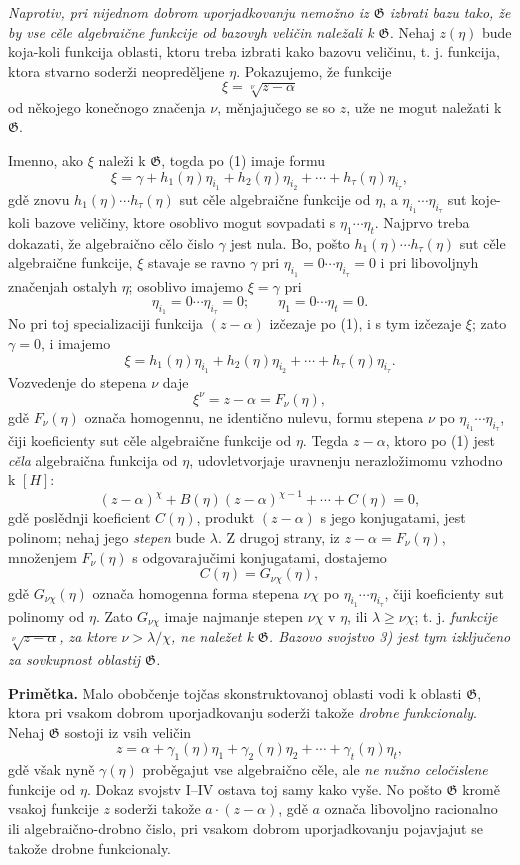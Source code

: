 \documentclass[11pt]{article}
\begin{document}
{\itshape Naprotiv, pri nijednom dobrom uporjadkovanju nemožno iz $\mathfrak G$
izbrati bazu tako, že by vse cěle algebraične funkcije od bazovyh veličin
naležali k $\mathfrak G$.} Nehaj $z(\eta)$ bude koja-koli funkcija oblasti,
ktoru treba izbrati kako bazovu veličinu, t. j. funkcija, ktora stvarno soderži
neopreděljene $\eta$. Pokazujemo, že funkcije
\[
 \xi=\sqrt[\nu]{z-\alpha}
\]
od někojego konečnogo značenja $\nu$, měnjajučego se so $z$, uže ne mogut
naležati k $\mathfrak G$.

Imenno, ako $\xi$ naleži k $\mathfrak G$, togda po (1) imaje formu
\[
 \xi=\gamma+h_1(\eta)\eta_{i_1}+h_2(\eta)\eta_{i_2}
      +\cdots+h_\tau(\eta)\eta_{i_\tau},
\]
gdě znovu $h_1(\eta)\cdots h_\tau(\eta)$ sut cěle algebraične funkcije od
$\eta$, a $\eta_{i_1}\cdots\eta_{i_\tau}$ sut koje-koli bazove veličiny, ktore
osoblivo mogut sovpadati s $\eta_1\cdots\eta_t$. Najprvo treba dokazati, že
algebraično cělo čislo $\gamma$ jest nula. Bo, pošto
$h_1(\eta)\cdots h_\tau(\eta)$ sut cěle algebraične funkcije, $\xi$ stavaje se
ravno $\gamma$ pri $\eta_{i_1}=0\cdots\eta_{i_\tau}=0$ i pri libovoljnyh
značenjah ostalyh $\eta$; osoblivo imajemo $\xi=\gamma$ pri
\[
 \eta_{i_1}=0\cdots \eta_{i_\tau}=0; \qquad
 \eta_1=0\cdots \eta_t=0.
\]
No pri toj specializaciji funkcija $(z-\alpha)$ izčezaje po (1), i s tym
izčezaje $\xi$; zato $\gamma=0$, i imajemo
\[
 \xi=h_1(\eta)\eta_{i_1}+h_2(\eta)\eta_{i_2}
      +\cdots+h_\tau(\eta)\eta_{i_\tau}.
\]
Vozvedenje do stepena $\nu$ daje
\[
 \xi^\nu=z-\alpha=F_\nu(\eta),
\]
gdě $F_\nu(\eta)$ označa homogennu, ne identično nulevu, formu stepena $\nu$ po
$\eta_{i_1}\cdots\eta_{i_\tau}$, čiji koeficienty sut cěle algebraične funkcije
od $\eta$. Tegda $z-\alpha$, ktoro po (1) jest {\itshape cěla} algebraična
funkcija od $\eta$, udovletvorjaje uravnenju nerazložimomu vzhodno k $[H]$:
\[
 (z-\alpha)^\chi+B(\eta)(z-\alpha)^{\chi-1}+\cdots+C(\eta)=0,
\]
gdě poslědnji koeficient $C(\eta)$, produkt $(z-\alpha)$ s jego konjugatami,
jest polinom; nehaj jego {\itshape stepen} bude $\lambda$. Z drugoj strany, iz
$z-\alpha=F_\nu(\eta)$, množenjem $F_\nu(\eta)$ s odgovarajučimi konjugatami,
dostajemo
\[
 C(\eta)=G_{\nu\chi}(\eta),
\]
gdě $G_{\nu\chi}(\eta)$ označa homogenna forma stepena $\nu\chi$ po
$\eta_{i_1}\cdots\eta_{i_\tau}$, čiji koeficienty sut polinomy od $\eta$.
Zato $G_{\nu\chi}$ imaje najmanje stepen $\nu\chi$ v $\eta$, ili
$\lambda\geq\nu\chi$; t. j. {\itshape funkcije
$\sqrt[\nu]{z-\alpha}$, za ktore $\nu>\lambda/\chi$, ne naležet k
$\mathfrak G$. Bazovo svojstvo 3) jest tym izključeno za sovkupnost oblastij
$\mathfrak G$.}

\textbf{Primětka.} Malo obobčenje tojčas skonstruktovanoj oblasti vodi k
oblasti $\mathfrak G$, ktora pri vsakom dobrom uporjadkovanju soderži takože
{\itshape drobne funkcionaly}. Nehaj $\mathfrak G$ sostoji iz vsih veličin
\[
 z=\alpha+\gamma_1(\eta)\eta_1+\gamma_2(\eta)\eta_2
      +\cdots+\gamma_t(\eta)\eta_t,
\]
gdě však nyně $\gamma(\eta)$ proběgajut vse algebraično cěle, ale
{\itshape ne nužno celočislene} funkcije od $\eta$. Dokaz svojstv I--IV ostava
toj samy kako vyše. No pošto $\mathfrak G$ kromě vsakoj funkcije $z$ soderži
takože $a\cdot(z-\alpha)$, gdě $a$ označa libovoljno racionalno ili
algebraično-drobno čislo, pri vsakom dobrom uporjadkovanju pojavjajut se takože
drobne funkcionaly.
\end{document}
